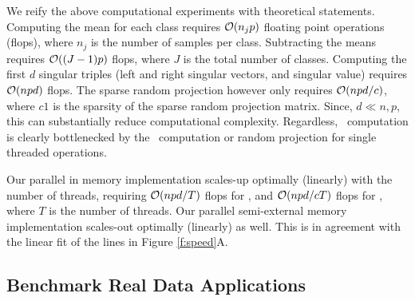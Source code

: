 \documentclass[10pt]{article}
\begin{document}

We reify the above computational experiments with theoretical statements.  Computing the mean for each class requires $\mathcal{O}(n_j p)$ floating point operations (flops), where $n_j$ is the number of samples per class. Subtracting the means requires $\mathcal{O}((J-1) p)$ flops, where $J$ is the total number of classes.  Computing the first $d$ singular triples (left and right singular vectors, and singular value) requires $\mathcal{O}(n p d)$ flops.
The sparse random projection however only requires $\mathcal{O}(n p d / c)$, where $c1$ is the sparsity of the sparse random projection matrix.
Since, $d \ll n,p$, this can substantially reduce computational complexity.  Regardless, \Lol~computation is clearly bottlenecked by the \Pca~computation or random projection for single threaded operations.

Our parallel in memory implementation scales-up optimally (linearly) with the number of threads, requiring $\mathcal{O}(n p d / T)$ flops for \Lol, 
and $\mathcal{O}(n p d / c T)$ flops for \Lal, 
where $T$ is the number of threads.  Our parallel semi-external memory implementation scales-out optimally (linearly) as well.  This is in agreement with the linear fit of the lines in Figure \ref{f:speed}A.





\subsection*{Benchmark Real Data Applications}
\end{document}
